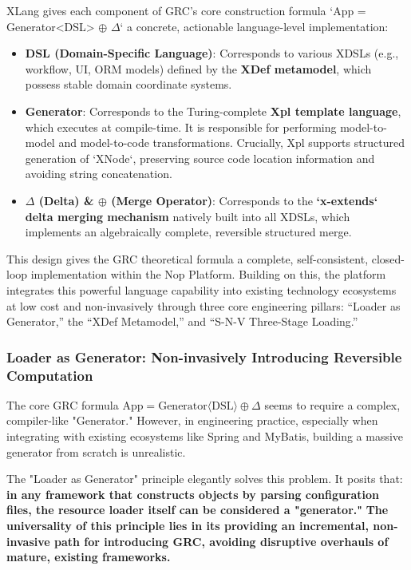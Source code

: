 \documentclass[11pt]{article}
\begin{document}
XLang gives each component of GRC's core construction formula `App = Generator<DSL> $\oplus$ $\Delta$` a concrete, actionable language-level implementation:

\begin{itemize}
    \item \textbf{DSL (Domain-Specific Language)}: Corresponds to various XDSLs (e.g., workflow, UI, ORM models) defined by the \textbf{XDef metamodel}, which possess stable domain coordinate systems.
    \item \textbf{Generator}: Corresponds to the Turing-complete \textbf{Xpl template language}, which executes at compile-time. It is responsible for performing model-to-model and model-to-code transformations. Crucially, Xpl supports structured generation of `XNode`, preserving source code location information and avoiding string concatenation.
    \item \textbf{$\Delta$ (Delta) \& $\oplus$ (Merge Operator)}: Corresponds to the \textbf{`x-extends` delta merging mechanism} natively built into all XDSLs, which implements an algebraically complete, reversible structured merge.
\end{itemize}

This design gives the GRC theoretical formula a complete, self-consistent, closed-loop implementation within the Nop Platform. Building on this, the platform integrates this powerful language capability into existing technology ecosystems at low cost and non-invasively through three core engineering pillars: ``Loader as Generator,'' the ``XDef Metamodel,'' and ``S-N-V Three-Stage Loading.''

\subsubsection{Loader as Generator: Non-invasively Introducing Reversible Computation}

The core GRC formula $\text{App} = \text{Generator}\langle\text{DSL}\rangle \oplus \Delta$ seems to require a complex, compiler-like "Generator." However, in engineering practice, especially when integrating with existing ecosystems like Spring and MyBatis, building a massive generator from scratch is unrealistic.

The "Loader as Generator" principle elegantly solves this problem. It posits that: \textbf{in any framework that constructs objects by parsing configuration files, the resource loader itself can be considered a "generator."} \textbf{The universality of this principle lies in its providing an incremental, non-invasive path for introducing GRC, avoiding disruptive overhauls of mature, existing frameworks.}
\end{document}
